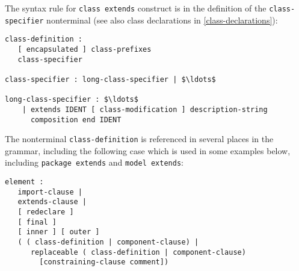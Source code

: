The syntax rule for \lstinline!class extends! construct is in the definition of the
\lstinline!class-specifier! nonterminal (see also class declarations in \cref{class-declarations}):
\begin{lstlisting}[language=grammar]
class-definition :
   [ encapsulated ] class-prefixes
   class-specifier

class-specifier : long-class-specifier | $\ldots$

long-class-specifier : $\ldots$
    | extends IDENT [ class-modification ] description-string
      composition end IDENT
\end{lstlisting}
The nonterminal \lstinline!class-definition! is referenced in several places in the
grammar, including the following case which is used in some examples
below, including \lstinline!package extends! and \lstinline!model extends!:
\begin{lstlisting}[language=grammar]
element :
   import-clause |
   extends-clause |
   [ redeclare ]
   [ final ]
   [ inner ] [ outer ]
   ( ( class-definition | component-clause) |
      replaceable ( class-definition | component-clause)
        [constraining-clause comment])
\end{lstlisting}

